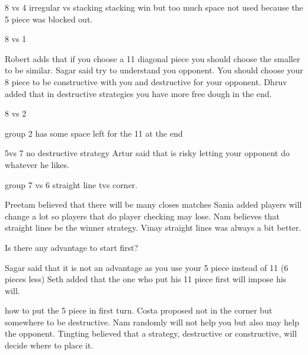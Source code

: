 8 vs 4
irregular vs stacking
stacking win but too much space not used because the 5 piece was blocked out.

8 vs 1

Robert adds that if you choose a 11 diagonal piece you should choose the smaller to be similar.
Sagar said try to understand you opponent. You should choose your 8 piece to be constructive with you and destructive for your opponent.
Dhruv added that in destructive strategies you have more free dough in the end.

8 vs 2

group 2 has some space left for the 11 at the end

5vs 7
no destructive strategy
Artur said that is risky letting your opponent do whatever he likes.

group 7 vs 6
straight line tvs corner.

Preetam believed that there will be many closes matches
Sania added players will change a lot so players that do player checking may lose.
Nam believes that straight lines be the winner strategy.
Vinay straight lines was always a bit better.

Is there any advantage to start first?

Sagar said  that it is not an advantage as you use your 5 piece instead of 11 (6 pieces less)
Seth added  that the one who put his 11 piece first will impose his will.

how to put the 5 piece in first turn.
Costa proposed not in the corner but somewhere to be destructive.
Nam randomly will not help you but also may help the opponent.
Tingting believed that a strategy, destructive or constructive, will decide where to place it.
